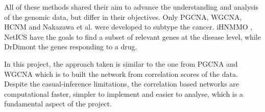 All of these methods shared their aim to advance the understanding and analysis of the genomic data, but differ in their objectives. Only PGCNA, WGCNA, HCNM and Nakazawa et al.\cite{Care2019-ij, Langfelder2008-sn, Nakazawa2021-yq,  Vangimalla2021-fc} were developed to subtype the cancer. iHNMMO \cite{Peng2017-ik}, NetICS \cite{Dimitrakopoulos2018-br} have the goals to find a subset of relevant genes at the disease level, while DrDimont \cite{Hiort2022-lk} the genes responding to a drug. 

In this project, the approach taken is similar to the one from PGCNA and WGCNA which is to built the network from correlation scores of the data. Despite the casual-inference limitations, the correlation based networks are computational faster, simpler to implement and easier to analyse, which is a fundamental aspect of the project.






